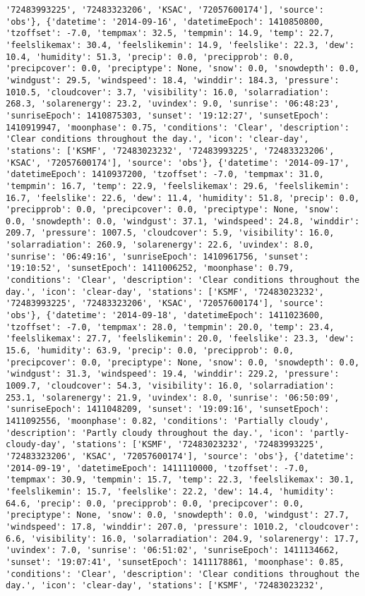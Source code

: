 \documentclass[
  letterpaper,
  DIV=11,
  numbers=noendperiod]{scrartcl}
\begin{document}
\begin{verbatim}
'72483993225', '72483323206', 'KSAC', '72057600174'], 'source': 'obs'}, {'datetime': '2014-09-16', 'datetimeEpoch': 1410850800, 'tzoffset': -7.0, 'tempmax': 32.5, 'tempmin': 14.9, 'temp': 22.7, 'feelslikemax': 30.4, 'feelslikemin': 14.9, 'feelslike': 22.3, 'dew': 10.4, 'humidity': 51.3, 'precip': 0.0, 'precipprob': 0.0, 'precipcover': 0.0, 'preciptype': None, 'snow': 0.0, 'snowdepth': 0.0, 'windgust': 29.5, 'windspeed': 18.4, 'winddir': 184.3, 'pressure': 1010.5, 'cloudcover': 3.7, 'visibility': 16.0, 'solarradiation': 268.3, 'solarenergy': 23.2, 'uvindex': 9.0, 'sunrise': '06:48:23', 'sunriseEpoch': 1410875303, 'sunset': '19:12:27', 'sunsetEpoch': 1410919947, 'moonphase': 0.75, 'conditions': 'Clear', 'description': 'Clear conditions throughout the day.', 'icon': 'clear-day', 'stations': ['KSMF', '72483023232', '72483993225', '72483323206', 'KSAC', '72057600174'], 'source': 'obs'}, {'datetime': '2014-09-17', 'datetimeEpoch': 1410937200, 'tzoffset': -7.0, 'tempmax': 31.0, 'tempmin': 16.7, 'temp': 22.9, 'feelslikemax': 29.6, 'feelslikemin': 16.7, 'feelslike': 22.6, 'dew': 11.4, 'humidity': 51.8, 'precip': 0.0, 'precipprob': 0.0, 'precipcover': 0.0, 'preciptype': None, 'snow': 0.0, 'snowdepth': 0.0, 'windgust': 37.1, 'windspeed': 24.8, 'winddir': 209.7, 'pressure': 1007.5, 'cloudcover': 5.9, 'visibility': 16.0, 'solarradiation': 260.9, 'solarenergy': 22.6, 'uvindex': 8.0, 'sunrise': '06:49:16', 'sunriseEpoch': 1410961756, 'sunset': '19:10:52', 'sunsetEpoch': 1411006252, 'moonphase': 0.79, 'conditions': 'Clear', 'description': 'Clear conditions throughout the day.', 'icon': 'clear-day', 'stations': ['KSMF', '72483023232', '72483993225', '72483323206', 'KSAC', '72057600174'], 'source': 'obs'}, {'datetime': '2014-09-18', 'datetimeEpoch': 1411023600, 'tzoffset': -7.0, 'tempmax': 28.0, 'tempmin': 20.0, 'temp': 23.4, 'feelslikemax': 27.7, 'feelslikemin': 20.0, 'feelslike': 23.3, 'dew': 15.6, 'humidity': 63.9, 'precip': 0.0, 'precipprob': 0.0, 'precipcover': 0.0, 'preciptype': None, 'snow': 0.0, 'snowdepth': 0.0, 'windgust': 31.3, 'windspeed': 19.4, 'winddir': 229.2, 'pressure': 1009.7, 'cloudcover': 54.3, 'visibility': 16.0, 'solarradiation': 253.1, 'solarenergy': 21.9, 'uvindex': 8.0, 'sunrise': '06:50:09', 'sunriseEpoch': 1411048209, 'sunset': '19:09:16', 'sunsetEpoch': 1411092556, 'moonphase': 0.82, 'conditions': 'Partially cloudy', 'description': 'Partly cloudy throughout the day.', 'icon': 'partly-cloudy-day', 'stations': ['KSMF', '72483023232', '72483993225', '72483323206', 'KSAC', '72057600174'], 'source': 'obs'}, {'datetime': '2014-09-19', 'datetimeEpoch': 1411110000, 'tzoffset': -7.0, 'tempmax': 30.9, 'tempmin': 15.7, 'temp': 22.3, 'feelslikemax': 30.1, 'feelslikemin': 15.7, 'feelslike': 22.2, 'dew': 14.4, 'humidity': 64.6, 'precip': 0.0, 'precipprob': 0.0, 'precipcover': 0.0, 'preciptype': None, 'snow': 0.0, 'snowdepth': 0.0, 'windgust': 27.7, 'windspeed': 17.8, 'winddir': 207.0, 'pressure': 1010.2, 'cloudcover': 6.6, 'visibility': 16.0, 'solarradiation': 204.9, 'solarenergy': 17.7, 'uvindex': 7.0, 'sunrise': '06:51:02', 'sunriseEpoch': 1411134662, 'sunset': '19:07:41', 'sunsetEpoch': 1411178861, 'moonphase': 0.85, 'conditions': 'Clear', 'description': 'Clear conditions throughout the day.', 'icon': 'clear-day', 'stations': ['KSMF', '72483023232', 
\end{verbatim}
\end{document}
